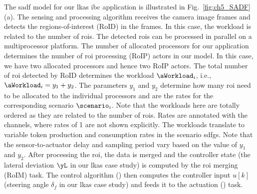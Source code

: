 The \gls{sadf} model for our \gls{lkas} \gls{ibc} application is illustrated in Fig.~\ref{fig:ch5_SADF}(a).
The sensing and processing algorithm receives the camera image frames and detects the regions-of-interest (RoID) in the frames. 
In this case, the workload is related to the number of \glspl{roi}.
The detected \glspl{roi} can be processed in parallel on a multiprocessor platform. The number of allocated processors for our application determines the number of \gls{roi} processing (RoIP) actors in our model. In this case, we have two allocated processors and hence two RoIP actors. The total number of \gls{roi} detected by RoID determines the workload $\aWorkload_i$, i.e., $\aWorkload_i=y_{1}+y_2$.
The parameters $y_1$ and $y_2$ determine how many \gls{roi} need to be allocated to the individual processors and are the rates for the corresponding scenario $\scenario_i$.
Note that the workloads here are totally ordered as they are related to the number of \glspl{roi}.
Rates are annotated with the channels, where rates of 1 are not shown explicitly. The workloads translate to variable token production and consumption rates in the scenario \glspl{sdfg}.
Note that the sensor-to-actuator delay and sampling period vary based on the value of $y_1$ and $y_2$. After processing the \gls{roi}, the data is merged and the controller state (the lateral deviation $\yL$ in our \gls{lkas} case study) is computed by the \gls{roi} merging (RoIM) task. The control algorithm (\taskC) then computes the controller input $u[k]$ (steering angle $\delta_f$ in our \gls{lkas} case study) and feeds it to the actuation (\taskA) task. 

